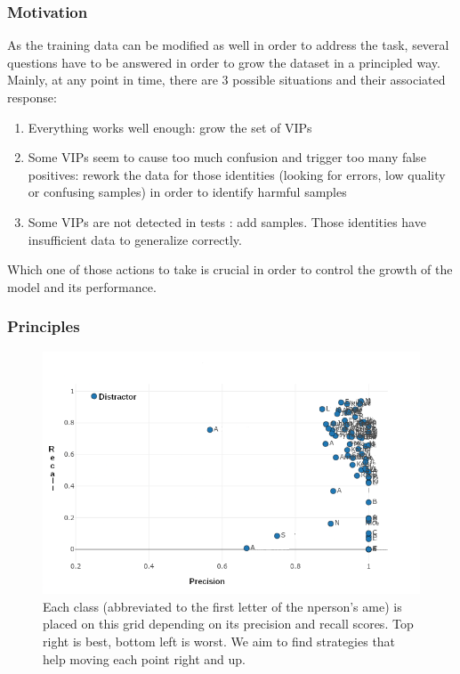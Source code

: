 \subsubsection{Motivation}

As the training data can be modified as well in order to address the task, several questions have to be answered in order to grow the dataset in a principled way. Mainly, at any point in time, there are 3 possible situations and their associated response:
\begin{enumerate}
    \item Everything works well enough: grow the set of VIPs
    \item Some VIPs seem to cause too much confusion and trigger too many false positives: rework the data for those identities (looking for errors, low quality or confusing samples) in order to identify harmful samples
    \item Some VIPs are not detected in tests : add samples. Those identities have insufficient data to generalize correctly.
\end{enumerate}

Which one of those actions to take is crucial in order to control the growth of the model and its performance.

\subsubsection{Principles}

\begin{figure}
    \centering
    \includegraphics[width=\columnwidth]{50-files/pr-plot.png}
    \caption{Each class (abbreviated to the first letter of the nperson's ame) is placed on this grid depending on its precision and recall scores. Top right is best, bottom left is worst. We aim to find strategies that help moving each point right and up.}
    \label{fig:pr-plot}
\end{figure}



